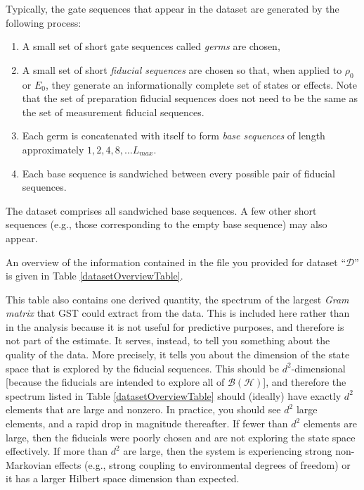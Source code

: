 \documentclass{article}[11pt]
\begin{document}
Typically, the gate sequences that appear in the dataset are generated by the following process:
\begin{enumerate}
\item A small set of short gate sequences called \emph{germs} are chosen,
\item A small set of short \emph{fiducial sequences} are chosen so that, when applied to $\rho_0$ or $E_0$, they generate an informationally complete set of states or effects.  Note that the set of preparation fiducial sequences does not need to be the same as the set of measurement fiducial sequences.
\item Each germ is concatenated with itself to form \emph{base sequences} of length approximately $1,2,4,8,\ldots L_{max}$.
\item Each base sequence is sandwiched between every possible pair of fiducial sequences.
\end{enumerate}
The dataset comprises all sandwiched base sequences.  A few other short sequences (e.g., those corresponding to the empty base sequence) may also appear.

\iftoggle{LsAndGermsSet}{ The fiducial sequences and germs for \emph{this} dataset are given in Tables \ref{fiducialListTable} and \ref{germListTable}. }{ Fiducial sequence and germ information was not given for this report, and may not be applicable.}  An overview of the information contained in the file you provided for dataset ``$\mathcal{D}$'' is given in Table \ref{datasetOverviewTable}.  

This table also contains one derived quantity, the spectrum of the largest \emph{Gram matrix} that GST could extract from the data.  This is included here rather than in the analysis because it is not useful for predictive purposes, and therefore is not part of the estimate.  It serves, instead, to tell you something about the quality of the data.  More precisely, it tells you about the dimension of the state space that is explored by the fiducial sequences.  This should be $d^2$-dimensional [because the fiducials are intended to explore all of $\mathcal{B}(\mathcal{H})$], and therefore the spectrum listed in Table \ref{datasetOverviewTable} should (ideally) have exactly $d^2$ elements that are large and nonzero.  In practice, you should see $d^2$ large elements, and a rapid drop in magnitude thereafter.  If fewer than $d^2$ elements are large, then the fiducials were poorly chosen and are not exploring the state space effectively.  If more than $d^2$ are large, then the system is experiencing strong non-Markovian effects (e.g., strong coupling to environmental degrees of freedom) or it has a larger Hilbert space dimension than expected.
\end{document}
